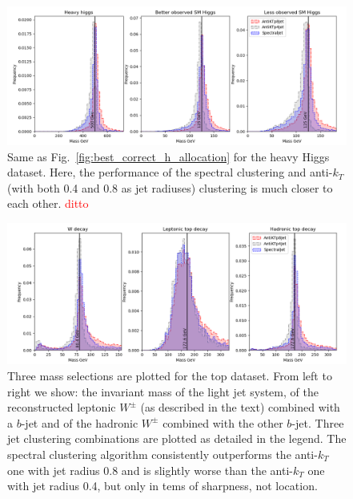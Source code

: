 \begin{figure}[htp]
    \includegraphics[width=1.\textwidth]{graphics/mass_peaks/heavy_long_correct_frequency.png}
    \caption{Same as Fig.~\ref{fig:best_correct_h_allocation} for the heavy Higgs dataset. Here, the performance of the spectral clustering and anti-$k_T$ (with both 0.4 and 0.8 as jet radiuses) clustering is much closer to each other. 
{\textcolor{red}{ditto}}
}\label{fig:heavy_correct_mass_peaks}
\end{figure}    


\begin{figure}[htp]
    \includegraphics[width=1.\textwidth]{graphics/mass_peaks/top_long_correct_frequency.png}
    \caption{Three mass selections are plotted for the top dataset. From left to right we show: the invariant mass of the light jet system, of the reconstructed leptonic $W^\pm$ (as  described in the text) combined with a $b$-jet and of the hadronic $W^\pm$ combined with the other $b$-jet. Three jet clustering combinations are plotted as detailed in the legend.
The spectral clustering algorithm  consistently outperforms the  anti-$k_T$ one with jet radius 0.8 and is slightly worse than the anti-$k_T$ one with jet radius 0.4, but only in tems of sharpness, not location.
    }\label{fig:top_correct_mass_peaks}
\end{figure}    

